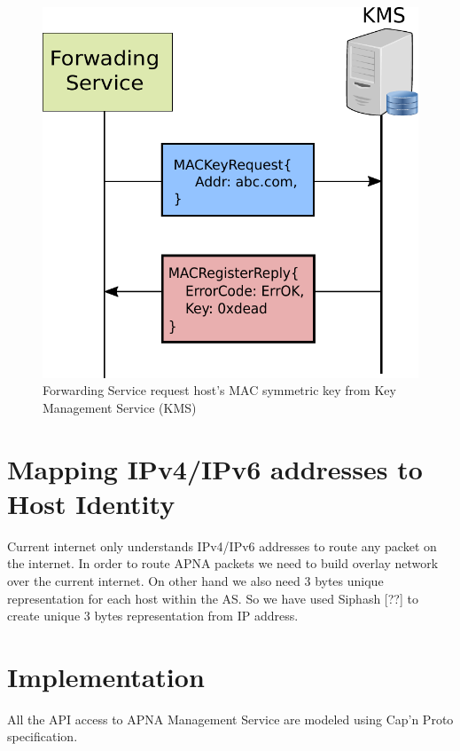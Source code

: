 \begin{figure}[th!]
\centering
\includegraphics[scale=0.6]{Figures/kms_request.pdf}
\decoRule
\caption[MAC Key Request]{Forwarding Service request host's MAC symmetric key from Key Management Service (KMS)}
\label{fig:kms_request}
\end{figure}

\section{Mapping IPv4/IPv6 addresses to Host Identity}
Current internet only understands IPv4/IPv6 addresses to route any packet on the internet. In order to route APNA packets we need to build overlay network over the current internet. On other hand we also need 3 bytes unique representation for each host within the AS. So we have used Siphash [??] to create unique 3 bytes representation from IP address.

\section{Implementation}
All the API access to APNA Management Service are modeled using Cap’n Proto specification.